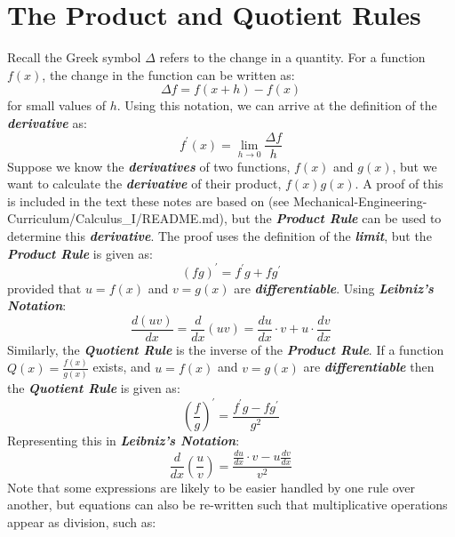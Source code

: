 \section{The Product and Quotient Rules}
Recall the Greek symbol $\Delta$ refers to the change in a quantity. For a function $f(x)$, the change in the function can be written as:
%
\begin{equation}
\Delta f = f(x+h) - f(x)
\end{equation}
%
for small values of $h$. Using this notation, we can arrive at the definition of the \textbf{\textit{derivative}} as:
%
\begin{equation}
f^\prime(x) = \lim_{h \rightarrow 0} \frac{\Delta f}{h}
\end{equation}
%
Suppose we know the \textbf{\textit{derivatives}} of two functions, $f(x)$ and $g(x)$, but we want to calculate the \textbf{\textit{derivative}} of their product, $f(x)g(x)$. A proof of this is included in the text these notes are based on (see Mechanical-Engineering-Curriculum/Calculus_I/README.md), but the \textbf{\textit{Product Rule}} can be used to determine this \textbf{\textit{derivative}}. The proof uses the definition of the \textbf{\textit{limit}}, but the \textbf{\textit{Product Rule}} is given as:
%
\begin{equation}
(fg)^\prime = f^\prime g + fg^\prime
\end{equation}
%
provided that $u = f(x)$ and $v = g(x)$ are \textbf{\textit{differentiable}}. Using \textbf{\textit{Leibniz's Notation}}:
%
\begin{equation}
\frac{d(uv)}{dx} = \frac{d}{dx}(uv)= \frac{du}{dx} \cdot v + u \cdot \frac{dv}{dx}
\end{equation}
%
Similarly, the \textbf{\textit{Quotient Rule}} is the inverse of the \textbf{\textit{Product Rule}}. If a function $Q(x) = \frac{f(x)}{g(x)}$ exists, and $u = f(x)$ and $v =g(x)$ are \textbf{\textit{differentiable}} then the \textbf{\textit{Quotient Rule}} is given as:
%
\begin{equation}
\left(\frac{f}{g}\right)^\prime = \frac{f^\prime g - f g^\prime}{g^2}
\end{equation}
%
Representing this in \textbf{\textit{Leibniz's Notation}}:
%
\begin{equation}
\frac{d}{dx}\left(\frac{u}{v}\right) = \frac{\frac{du}{dx} \cdot v - u \frac{dv}{dx}}{v^2}
\end{equation}
%
Note that some expressions are likely to be easier handled by one rule over another, but equations can also be re-written such that multiplicative operations appear as division, such as:
